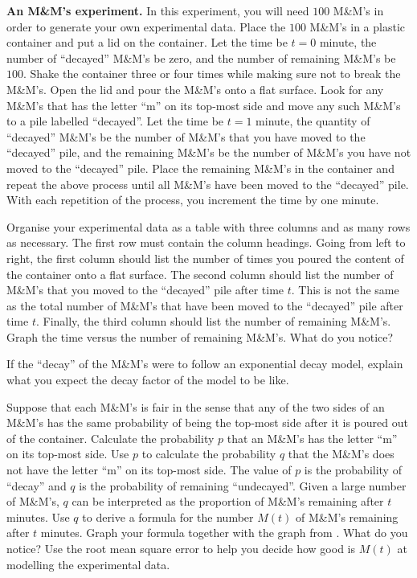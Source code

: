 \documentclass[a4paper,oneside,12pt]{article}
\begin{document}
\begin{exercise}
\label{ex:MnM_experiment}
\textbf{An M\&M's experiment.}
In this experiment, you will need $100$ M\&M's in order to generate
your own experimental data.  Place the $100$ M\&M's in a plastic
container and put a lid on the container.  Let the time be $t = 0$
minute, the number of ``decayed'' M\&M's be zero, and the number of
remaining M\&M's be $100$.  Shake the container three or four times
while making sure not to break the M\&M's.  Open the lid and pour the
M\&M's onto a flat surface.  Look for any M\&M's that has the letter
``m'' on its top-most side and move any such M\&M's to a pile labelled
``decayed''.  Let the time be $t = 1$ minute, the quantity of
``decayed'' M\&M's be the number of M\&M's that you have moved to the
``decayed'' pile, and the remaining M\&M's be the number of M\&M's you
have not moved to the ``decayed'' pile.  Place the remaining M\&M's in
the container and repeat the above process until all M\&M's have been
moved to the ``decayed'' pile.  With each repetition of the process,
you increment the time by one minute.
\begin{packedenum}
\item\label{subex:MnM_data}
  Organise your experimental data as a table with three columns and as
  many rows as necessary.  The first row must contain the column
  headings.  Going from left to right, the first column should list
  the number of times you poured the content of the container onto a
  flat surface.  The second column should list the number of M\&M's
  that you moved to the ``decayed'' pile after time $t$.  This is not
  the same as the total number of M\&M's that have been moved to the
  ``decayed'' pile after time $t$.  Finally, the third column should
  list the number of remaining M\&M's.  Graph the time versus the
  number of remaining M\&M's.  What do you notice?

\item\label{subex:MnM_decay_factor}
  If the ``decay'' of the M\&M's were to follow an exponential decay
  model, explain what you expect the decay factor of the model to be
  like.

\item\label{subex:MnM_probability}
  Suppose that each M\&M's is fair in the sense that any of the two
  sides of an M\&M's has the same probability of being the top-most
  side after it is poured out of the container.  Calculate the
  probability $p$ that an M\&M's has the letter ``m'' on its top-most
  side.  Use $p$ to calculate the probability $q$ that the M\&M's does
  not have the letter ``m'' on its top-most side.  The value of $p$ is
  the probability of ``decay'' and $q$ is the probability of remaining
  ``undecayed''.  Given a large number of M\&M's, $q$ can be
  interpreted as the proportion of M\&M's remaining after $t$
  minutes.  Use $q$ to derive a formula for the number $M(t)$ of
  M\&M's remaining after $t$ minutes.  Graph your formula together
  with the graph from .  What do you notice?  Use
  the root mean square error to help you decide how good is $M(t)$ at
  modelling the experimental data.
\end{packedenum}
\end{exercise}
\end{document}
